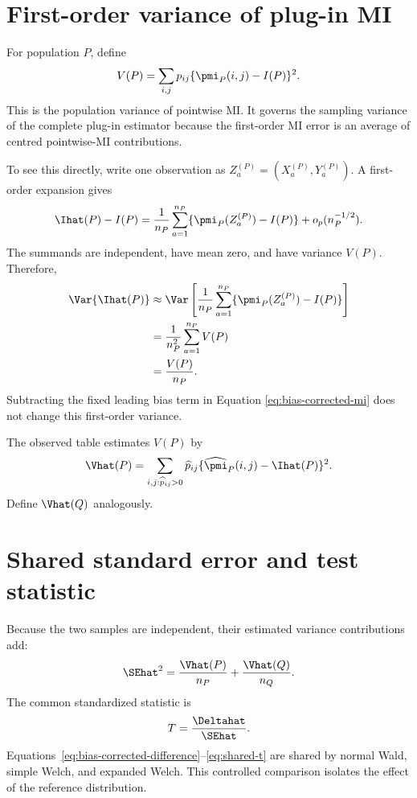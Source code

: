 \section{First-order variance of plug-in MI}

For population \(P\), define
\begin{equation}
  V(P)
  =\sum_{i,j}p_{ij}
  \{\pmi_P(i,j)-I(P)\}^2.
  \label{eq:population-mi-variance}
\end{equation}
This is the population variance of pointwise MI. It governs the sampling
variance of the complete plug-in estimator because the first-order MI error is
an average of centred pointwise-MI contributions.

To see this directly, write one observation as
\(Z_a^{(P)}=(X_a^{(P)},Y_a^{(P)})\). A first-order expansion gives
\begin{equation}
  \Ihat(P)-I(P)
  =
  \frac{1}{n_P}
  \sum_{a=1}^{n_P}
  \{\pmi_P(Z_a^{(P)})-I(P)\}
  +o_p(n_P^{-1/2}).
  \label{eq:mi-asymptotic-linear}
\end{equation}
The summands are independent, have mean zero, and have variance \(V(P)\).
Therefore,
\begin{align}
  \Var\{\Ihat(P)\}
  &\approx
  \Var\left[
  \frac{1}{n_P}
  \sum_{a=1}^{n_P}
  \{\pmi_P(Z_a^{(P)})-I(P)\}
  \right]\\
  &=\frac{1}{n_P^2}
  \sum_{a=1}^{n_P}V(P)\\
  &=\frac{V(P)}{n_P}.
  \label{eq:mi-sampling-variance}
\end{align}
Subtracting the fixed leading bias term in Equation
\eqref{eq:bias-corrected-mi} does not change this first-order variance.

The observed table estimates \(V(P)\) by
\begin{equation}
  \Vhat(P)
  =\sum_{i,j:\widehat p_{ij}>0}
  \widehat p_{ij}
  \{\widehat\pmi_P(i,j)-\Ihat(P)\}^2.
  \label{eq:estimated-mi-variance}
\end{equation}
Define \(\Vhat(Q)\) analogously.

\section{Shared standard error and test statistic}

Because the two samples are independent, their estimated variance
contributions add:
\begin{equation}
  \SEhat^2
  =\frac{\Vhat(P)}{n_P}
  +\frac{\Vhat(Q)}{n_Q}.
  \label{eq:shared-se}
\end{equation}
The common standardized statistic is
\begin{equation}
  T=\frac{\Deltahat}{\SEhat}.
  \label{eq:shared-t}
\end{equation}
Equations~\eqref{eq:bias-corrected-difference}--\eqref{eq:shared-t} are shared
by normal Wald, simple Welch, and expanded Welch. This controlled comparison
isolates the effect of the reference distribution.

